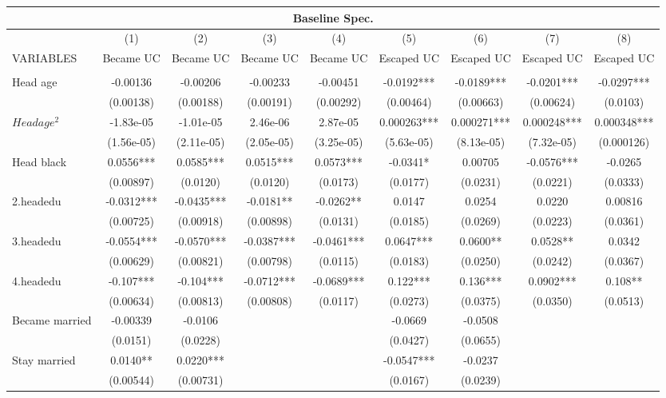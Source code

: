 \begin{tabular}{lcccccccc}
\multicolumn{9}{c}{Baseline Spec.} \\ \hline
 & (1) & (2) & (3) & (4) & (5) & (6) & (7) & (8) \\
VARIABLES & Became UC & Became UC & Became UC & Became UC & Escaped UC & Escaped UC & Escaped UC & Escaped UC \\ \hline
 &  &  &  &  &  &  &  &  \\
Head age & -0.00136 & -0.00206 & -0.00233 & -0.00451 & -0.0192*** & -0.0189*** & -0.0201*** & -0.0297*** \\
 & (0.00138) & (0.00188) & (0.00191) & (0.00292) & (0.00464) & (0.00663) & (0.00624) & (0.0103) \\
$ Head age^2$ & -1.83e-05 & -1.01e-05 & 2.46e-06 & 2.87e-05 & 0.000263*** & 0.000271*** & 0.000248*** & 0.000348*** \\
 & (1.56e-05) & (2.11e-05) & (2.05e-05) & (3.25e-05) & (5.63e-05) & (8.13e-05) & (7.32e-05) & (0.000126) \\
Head black & 0.0556*** & 0.0585*** & 0.0515*** & 0.0573*** & -0.0341* & 0.00705 & -0.0576*** & -0.0265 \\
 & (0.00897) & (0.0120) & (0.0120) & (0.0173) & (0.0177) & (0.0231) & (0.0221) & (0.0333) \\
2.headedu & -0.0312*** & -0.0435*** & -0.0181** & -0.0262** & 0.0147 & 0.0254 & 0.0220 & 0.00816 \\
 & (0.00725) & (0.00918) & (0.00898) & (0.0131) & (0.0185) & (0.0269) & (0.0223) & (0.0361) \\
3.headedu & -0.0554*** & -0.0570*** & -0.0387*** & -0.0461*** & 0.0647*** & 0.0600** & 0.0528** & 0.0342 \\
 & (0.00629) & (0.00821) & (0.00798) & (0.0115) & (0.0183) & (0.0250) & (0.0242) & (0.0367) \\
4.headedu & -0.107*** & -0.104*** & -0.0712*** & -0.0689*** & 0.122*** & 0.136*** & 0.0902*** & 0.108** \\
 & (0.00634) & (0.00813) & (0.00808) & (0.0117) & (0.0273) & (0.0375) & (0.0350) & (0.0513) \\
Became married & -0.00339 & -0.0106 &  &  & -0.0669 & -0.0508 &  &  \\
 & (0.0151) & (0.0228) &  &  & (0.0427) & (0.0655) &  &  \\
Stay married & 0.0140** & 0.0220*** &  &  & -0.0547*** & -0.0237 &  &  \\
 & (0.00544) & (0.00731) &  &  & (0.0167) & (0.0239) &  &  \\

\end{tabular}
